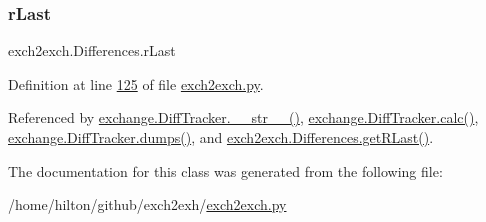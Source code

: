\mbox{\label{classexch2exch_1_1_differences_a3c26c51929ce75e055f8a606aaeb849d}} 
\subsubsection{\texorpdfstring{r\+Last}{rLast}}
{\footnotesize\ttfamily exch2exch.\+Differences.\+r\+Last}



Definition at line \hyperlink{exch2exch_8py_source_l00125}{125} of file \hyperlink{exch2exch_8py_source}{exch2exch.\+py}.



Referenced by \hyperlink{exchange_8py_source_l00336}{exchange.\+Diff\+Tracker.\+\_\+\+\_\+str\+\_\+\+\_\+()}, \hyperlink{exchange_8py_source_l00309}{exchange.\+Diff\+Tracker.\+calc()}, \hyperlink{exchange_8py_source_l00385}{exchange.\+Diff\+Tracker.\+dumps()}, and \hyperlink{exch2exch_8py_source_l00148}{exch2exch.\+Differences.\+get\+R\+Last()}.



The documentation for this class was generated from the following file\+:\begin{DoxyCompactItemize}
\item 
/home/hilton/github/exch2exh/\hyperlink{exch2exch_8py}{exch2exch.\+py}\end{DoxyCompactItemize}
